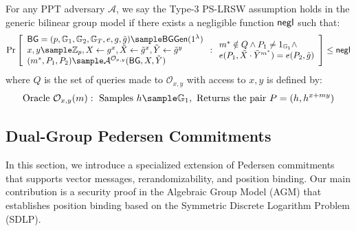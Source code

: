 \begin{definition}
For any PPT adversary $\mathcal{A}$, we say the Type-3 PS-LRSW assumption holds in the generic bilinear group model if there exists a negligible function $\mathsf{negl}$ such that:
$$\Pr\left[\begin{array}{l}
    \BG = (p, \G_1, \G_2, \G_T, e, g, \tilde{g}) \sample \BGGen(1^\lambda) \\
    x,y \sample \Z_p, X \gets g^x, \tilde{X} \gets \tilde{g}^x, \tilde{Y} \gets \tilde{g}^y \\
    (m^*, P_1, P_2) \sample \mathcal{A}^{\mathcal{O}_{x,y}}(\BG, X, \tilde{Y})
\end{array} : \begin{array}{l}
    m^* \notin Q \land P_1 \neq 1_{\G_1} \land \\
    e(P_1, \tilde{X} \cdot \tilde{Y}^{m^*}) = e(P_2, \tilde{g})
\end{array}\right] \leq \negl$$
where $Q$ is the set of queries made to $\mathcal{O}_{x,y}$ with access to $x,y$ is defined by:
\[
\text{Oracle }\mathcal{O}_{x,y}(m): \text{ Samples } h \sample \G_1, \text{ Returns the pair } P = (h, h^{x+my})
\]

\end{definition}






\subsection{Dual-Group Pedersen Commitments}\label{sec:commitment}
In this section, we introduce a specialized extension of Pedersen commitments that supports vector messages, rerandomizability, and position binding. Our main contribution is a security proof in the Algebraic Group Model (AGM) that establishes position binding based on the Symmetric Discrete Logarithm Problem (SDLP).


